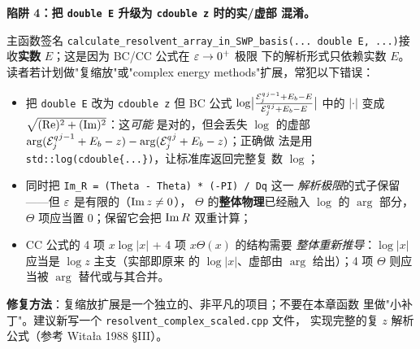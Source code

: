 \begin{pitfallbox}[label=box:ch10-pitfall-z-complex]
\textbf{陷阱 4：把 \texttt{double E} 升级为 \texttt{cdouble z} 时的实/虚部
混淆。}

主函数签名 \texttt{calculate\_resolvent\_array\_in\_SWP\_basis(... double E,
...)}\;接收\textbf{实数} \(E\)；这是因为 BC/CC 公式在 \(\varepsilon \to 0^{+}\) 极限
下的解析形式只依赖实数 \(E\)。读者若计划做"复缩放"或"complex energy
methods"扩展，常犯以下错误：

\begin{itemize}
  \item 把 \texttt{double E} 改为 \texttt{cdouble z} 但 BC 公式
        \(\log\bigl|\frac{{\mathcal{E}_{j}^{q}}^{j-1}+E_b-E}{{\mathcal{E}_{j}^{q}}^{j}+E_b-E}\bigr|\)
        中的 \(|\cdot|\) 变成 \(\sqrt{(\operatorname{Re})^2 + (\operatorname{Im})^2}\)：这\emph{可能}
        是对的，但会丢失 \(\log\) 的虚部
        \(\arg({\mathcal{E}_{j}^{q}}^{j-1}+E_b-z) - \arg({\mathcal{E}_{j}^{q}}^{j}+E_b-z)\)；正确做
        法是用 \texttt{std::log(cdouble\{...\})}，让标准库返回完整复
        数 \(\log\)；
  \item 同时把 \texttt{Im\_R = (Theta - Theta) * (-PI) / Dq} 这一
        \emph{解析极限}的式子保留——但 \(\varepsilon\) 是有限的（\(\operatorname{Im} z \neq 0\)），
        \(\Theta\) 的\textbf{整体物理}已经融入 \(\log\) 的 \(\arg\) 部分，
        \(\Theta\) 项应当置 \(0\)；保留它会把 \(\operatorname{Im} R\) 双重计算；
  \item CC 公式的 4 项 \(x\log|x|\) + 4 项 \(x\Theta(x)\) 的结构需要
        \emph{整体重新推导}：\(\log|x|\) 应当是 \(\log z\) 主支（实部即原来
        的 \(\log|x|\)、虚部由 \(\arg\) 给出）；4 项 \(\Theta\) 则应当被
        \(\arg\) 替代或与其合并。
\end{itemize}

\textbf{修复方法}：复缩放扩展是一个独立的、非平凡的项目；不要在本章函数
里做"小补丁"。建议新写一个 \texttt{resolvent\_complex\_scaled.cpp} 文件，
实现完整的复 \(z\) 解析公式（参考 Witała 1988 \cite{Witala1988} \S III）。
\end{pitfallbox}

